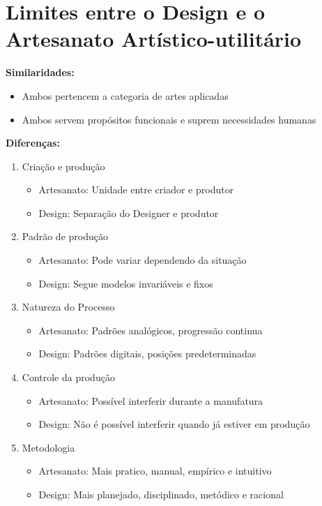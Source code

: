 \documentclass{article}
\begin{document}
\newpage
\section{Limites entre o Design e o Artesanato Artístico-utilitário}
\textbf{Similaridades:}
\begin{itemize}
    \item Ambos pertencem a categoria de artes aplicadas
    \item Ambos servem propósitos funcionais e suprem necessidades humanas
\end{itemize}
\textbf{Diferenças:}
\begin{enumerate}
    \item Criação e produção
    \begin{itemize}
        \item Artesanato: Unidade entre criador e produtor
        \item Design: Separação do Designer e produtor
    \end{itemize}
    \item Padrão de produção
    \begin{itemize}
        \item Artesanato: Pode variar dependendo da situação
        \item Design: Segue modelos invariáveis e fixos
    \end{itemize}
    \item Natureza do Processo
    \begin{itemize}
        \item Artesanato: Padrões analógicos, progressão continua
        \item Design: Padrões digitais, posições predeterminadas
    \end{itemize}
    \item Controle da produção
    \begin{itemize}
        \item Artesanato: Possível interferir durante a manufatura
        \item Design: Não é possível interferir quando já estiver em produção
    \end{itemize}
    \item Metodologia
    \begin{itemize}
        \item Artesanato: Mais pratico, manual, empírico e intuitivo 
        \item Design: Mais planejado, disciplinado, metódico e racional
    \end{itemize}

\end{enumerate}
\end{document}
